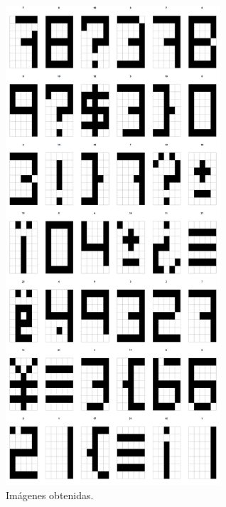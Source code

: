 \documentclass{article}
\begin{document}
\begin{figure}[htb!] %
    \centering
    \includegraphics[width=80mm]{p12g.png} %
    \caption{Im\'agenes obtenidas.}
    \label{Figura 2}
\end{figure}

\newpage


\end{document}
